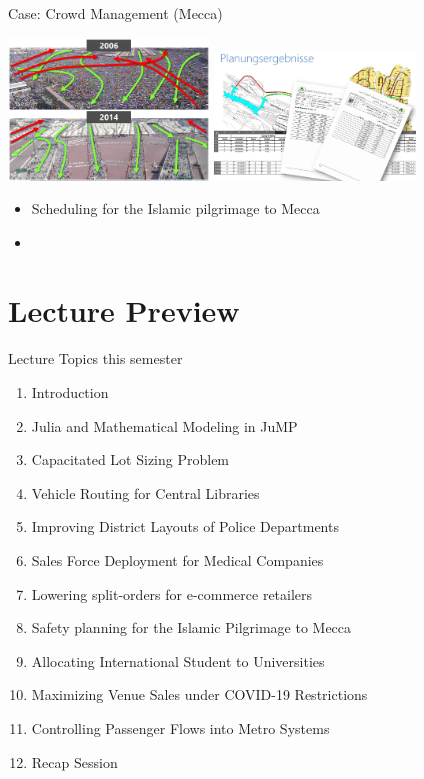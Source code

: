 \documentclass[aspectratio=1610,12pt]{beamer}
\begin{document}
\begin{frame}[fragile]{Case: Crowd Management (Mecca)}
  \begin{center}
      \includegraphics[width=0.4\textwidth]{images/HajjProjekt2.jpg}
      \includegraphics[width=0.4\textwidth]{images/HajjProjekt.jpg}
  \end{center}
    \begin{itemize}
         \item Scheduling for the Islamic pilgrimage to Mecca
         \item {}
    \end{itemize}
\end{frame}

\section{Lecture Preview}

\begin{frame}[fragile]{Lecture Topics this semester}
    	\begin{enumerate}
    		\item Introduction
            \item Julia and Mathematical Modeling in JuMP
            \item Capacitated Lot Sizing Problem
			\item Vehicle Routing for Central Libraries
			\item Improving District Layouts of Police Departments
 			\item Sales Force Deployment for Medical Companies
			\item Lowering split-orders for e-commerce retailers
			\item Safety planning for the Islamic Pilgrimage to Mecca
			\item Allocating International Student to Universities
			\item Maximizing Venue Sales under COVID-19 Restrictions
            \item Controlling Passenger Flows into Metro Systems
            \item Recap Session
    	\end{enumerate}
\end{frame}
\end{document}
